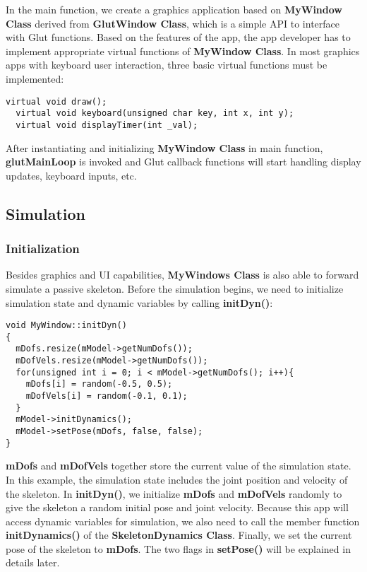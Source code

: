 In the main function, we create a graphics application based on
\textbf{MyWindow Class} derived from \textbf{GlutWindow Class}, which
is a simple API to interface with Glut functions. Based on the
features of the app, the app developer has to implement appropriate
virtual functions of \textbf{MyWindow Class}. In most graphics apps
with keyboard user interaction, three basic virtual functions must be
implemented:

\ttfamily
\begin{lstlisting}[caption=MyWindow.h]
  virtual void draw();
  virtual void keyboard(unsigned char key, int x, int y);
  virtual void displayTimer(int _val);
\end{lstlisting}
\rmfamily 

After instantiating and initializing \textbf{MyWindow Class} in main
function, \textbf{glutMainLoop} is invoked and Glut callback functions
will start handling display updates, keyboard inputs, etc.

\subsection{Simulation}
\subsubsection{Initialization}
Besides graphics and UI capabilities, \textbf{MyWindows Class} is also
able to forward simulate a passive skeleton. Before the simulation
begins, we need to initialize simulation state and dynamic variables
by calling \textbf{initDyn()}:

\ttfamily
\begin{lstlisting}[caption=MyWindow.cpp]
void MyWindow::initDyn()
{
  mDofs.resize(mModel->getNumDofs());
  mDofVels.resize(mModel->getNumDofs());
  for(unsigned int i = 0; i < mModel->getNumDofs(); i++){
    mDofs[i] = random(-0.5, 0.5);
    mDofVels[i] = random(-0.1, 0.1);
  }
  mModel->initDynamics();
  mModel->setPose(mDofs, false, false);
}
\end{lstlisting}
\rmfamily 

\textbf{mDofs} and \textbf{mDofVels} together store the current value
of the simulation state. In this example, the simulation state
includes the joint position and velocity of the skeleton. In
\textbf{initDyn()}, we initialize \textbf{mDofs} and \textbf{mDofVels}
randomly to give the skeleton a random initial pose and joint
velocity. Because this app will access dynamic variables for
simulation, we also need to call the member function
\textbf{initDynamics()} of the \textbf{SkeletonDynamics
  Class}. Finally, we set the current pose of the skeleton to
\textbf{mDofs}. The two flags in \textbf{setPose()} will be explained
in details later.

